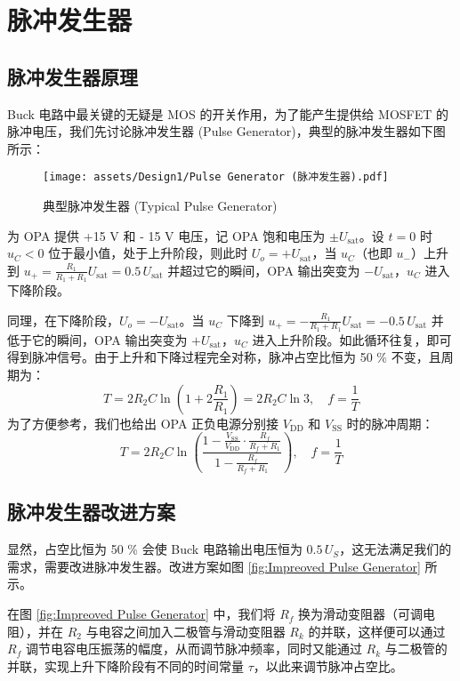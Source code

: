 \documentclass[UTF8]{article}
\theoremstyle{MyLineTheoremStyle} %
\theoremstyle{MyBlockTheoremStyle} %
\theoremstyle{MySubsubsectionStyle} %
\begin{document}
\section{脉冲发生器}

\subsection{脉冲发生器原理}
Buck 电路中最关键的无疑是 MOS 的开关作用，为了能产生提供给 MOSFET 的脉冲电压，我们先讨论脉冲发生器 (Pulse Generator)，典型的脉冲发生器如下图所示：
\begin{figure}[H]\centering
    \texttt{[image: assets/Design1/Pulse Generator (脉冲发生器).pdf]}
    \caption{典型脉冲发生器 (Typical Pulse Generator)}
\end{figure}
为 OPA 提供 +15 V 和 - 15 V 电压，记 OPA 饱和电压为 $\pm U_{\text{sat}}$。设 $t = 0$ 时 $u_C < 0$ 位于最小值，处于上升阶段，则此时 $U_o = +U_{\text{sat}}$，当 $u_C$（也即 $u_-$）上升到 $u_+ = \frac{R_1}{R_1 + R_1}U_{\text{sat}} = 0.5\, U_{\text{sat}}$ 并超过它的瞬间，OPA 输出突变为 $-U_{\text{sat}}$，$u_C$ 进入下降阶段。

同理，在下降阶段，$U_o = -U_{\text{sat}}$。当 $u_C$ 下降到 $u_+ = -\frac{R_1}{R_1 + R_1}U_{\text{sat}} = -0.5\, U_{\text{sat}}$ 并低于它的瞬间，OPA 输出突变为 $+U_{\text{sat}}$，$u_C$ 进入上升阶段。如此循环往复，即可得到脉冲信号。由于上升和下降过程完全对称，脉冲占空比恒为 50 \% 不变，且周期为：
\begin{equation}
T = 2R_2 C \ln \left( 1 + 2\frac{R_1}{R_1} \right) = 2R_2 C \ln 3,\quad f = \frac{1}{T}
\end{equation}
为了方便参考，我们也给出 OPA 正负电源分别接 $V_{\text{DD}}$ 和 $V_{\text{SS}}$ 时的脉冲周期：
\begin{equation}
T = 2R_2 C \ln \left( \frac{1 - \frac{V_{\text{SS}}}{V_{\text{DD}}}\cdot \frac{R_f}{R_f + R_1}}{1 - \frac{R_f}{R_f + R_1}} \right),\quad f = \frac{1}{T}
\end{equation}


\subsection{脉冲发生器改进方案}

显然，占空比恒为 50 \% 会使 Buck 电路输出电压恒为 $0.5 \,U_S$，这无法满足我们的需求，需要改进脉冲发生器。改进方案如图 \ref{fig:Impreoved Pulse Generator} 所示。


在图 \ref{fig:Impreoved Pulse Generator} 中，我们将 $R_f$ 换为滑动变阻器（可调电阻），并在 $R_2$ 与电容之间加入二极管与滑动变阻器 $R_k$ 的并联，这样便可以通过 $R_f$ 调节电容电压振荡的幅度，从而调节脉冲频率，同时又能通过 $R_k$ 与二极管的并联，实现上升下降阶段有不同的时间常量 $\tau$，以此来调节脉冲占空比。
\end{document}
